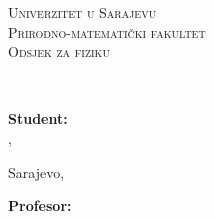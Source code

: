 %
%
%


\begin{titlepage}
	\begin{figure}[t]
		\centering
		\begin{minipage}{.6\textwidth}
			\centering
			\textsc{\large Univerzitet u Sarajevu}\\
			\textsc{\large Prirodno-matematički fakultet}\\
			\textsc{\large Odsjek za fiziku}
		\end{minipage}
	\end{figure}
	\vspace*{\fill}
	\begin{center}
		\textbf{\Large \MakeUppercase\@naslov}\\
		\vspace{2mm}
		\large \MakeUppercase\@podnaslov
	\end{center}
	\vspace*{\fill}
	\begin{figure}[b]
		\centering
		\begin{minipage}{.325\textwidth}
			\textbf{Student:}\\
			\@student, \@indeks \\
		\end{minipage}
		\begin{minipage}{.30\textwidth}
			\begin{center}
				\vspace{25mm}
				Sarajevo, \@datum
			\end{center}
		\end{minipage}
		\begin{minipage}{.325\textwidth}
			\textbf{Profesor: }\\
			\@profesor \\
		\end{minipage}
	\end{figure}
\end{titlepage}